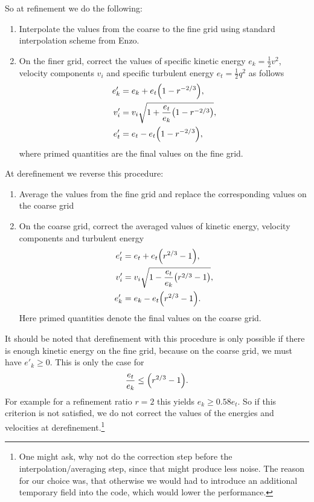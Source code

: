 So at refinement we do the following:
\begin{enumerate}
\item Interpolate the values from the coarse to the fine grid using standard
interpolation scheme from Enzo.
\item On the finer grid, correct the values of specific kinetic energy 
$e_k= \frac{1}{2}v^2$, velocity components $v_i$ and specific turbulent energy
$e_t=\frac{1}{2}q^2$ as follows
\begin{align}
e'_k&=e_k+e_t { \left( 1-r^{-2/3} \right) },\\
v'_i&=v_i \sqrt{1+\frac{e_t}{e_k}{ \left( 1-r^{-2/3} \right) }},\\
e'_t&=e_t-e_t{ \left( 1-r^{-2/3} \right) },
\end{align}
where primed quantities are the final values on the fine grid.
\end{enumerate}

At derefinement we reverse this procedure:
\begin{enumerate}
\item Average the values from the fine grid and replace the corresponding values
on the coarse grid
\item On the coarse grid, correct the averaged values of kinetic energy, 
velocity components and turbulent energy
\begin{align}
e'_t&=e_t+e_t{ \left( r^{2/3}-1 \right) },\\
v'_i&=v_i \sqrt{1-\frac{e_t}{e_k}{ \left( r^{2/3}-1 \right) }},\\
e'_k&=e_k-e_t { \left( r^{2/3}-1 \right) }.
\end{align}
Here primed quantities denote the final values on the coarse grid. 
\end{enumerate}
It should be noted that derefinement with this procedure is only possible if
there is enough kinetic energy on the fine grid, because on the coarse grid, we
must have $e'_k \geq 0$. This is only the case for
\begin{align}
\frac{e_t}{e_k} \leq { \left( r^{2/3}-1 \right) }.
\end{align}
For example for a refinement ratio $r=2$ this yields $e_k \geq 0.58 e_t$.
So if this criterion is not satisfied, we do not correct the values of the
energies and velocities at derefinement.\footnote{One might ask, why not do
the correction step before the interpolation/averaging step, since that might
produce less noise. The reason for our choice was, that otherwise we would had
to introduce an additional temporary field into the code, which would lower
the performance.}

